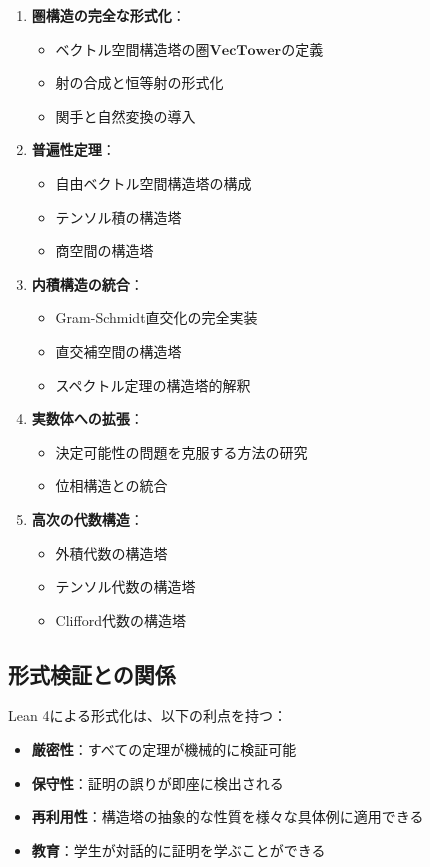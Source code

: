 \documentclass[11pt,a4paper]{ltjsarticle}
\theoremstyle{definition}
\begin{document}
\begin{enumerate}
\item \textbf{圏構造の完全な形式化}：
\begin{itemize}
\item ベクトル空間構造塔の圏$\mathbf{VecTower}$の定義
\item 射の合成と恒等射の形式化
\item 関手と自然変換の導入
\end{itemize}

\item \textbf{普遍性定理}：
\begin{itemize}
\item 自由ベクトル空間構造塔の構成
\item テンソル積の構造塔
\item 商空間の構造塔
\end{itemize}

\item \textbf{内積構造の統合}：
\begin{itemize}
\item Gram-Schmidt直交化の完全実装
\item 直交補空間の構造塔
\item スペクトル定理の構造塔的解釈
\end{itemize}

\item \textbf{実数体への拡張}：
\begin{itemize}
\item 決定可能性の問題を克服する方法の研究
\item 位相構造との統合
\end{itemize}

\item \textbf{高次の代数構造}：
\begin{itemize}
\item 外積代数の構造塔
\item テンソル代数の構造塔
\item Clifford代数の構造塔
\end{itemize}
\end{enumerate}

\subsection{形式検証との関係}

Lean 4による形式化は、以下の利点を持つ：
\begin{itemize}
\item \textbf{厳密性}：すべての定理が機械的に検証可能
\item \textbf{保守性}：証明の誤りが即座に検出される
\item \textbf{再利用性}：構造塔の抽象的な性質を様々な具体例に適用できる
\item \textbf{教育}：学生が対話的に証明を学ぶことができる
\end{itemize}
\end{document}
